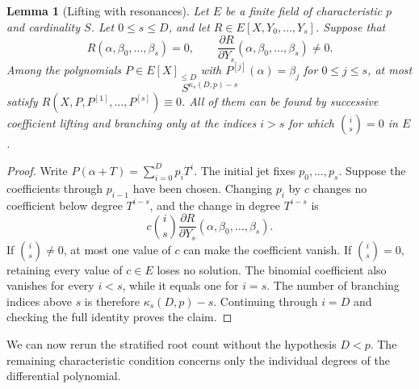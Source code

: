\documentclass[11pt,letterpaper]{article}
\newtheorem{lemma}[lemma]{Lemma}
\theoremstyle{definition}
\begin{document}
\begin{lemma}[Lifting with resonances]
\label{lem:resonant-lifting}
Let \(E\) be a finite field of characteristic \(p\) and cardinality \(S\).
Let \(0\leq s\leq D\), and let
\(R\in E[X,Y_0,\ldots,Y_s]\).  Suppose that
\[
  R(\alpha,\beta_0,\ldots,\beta_s)=0,
  \qquad
  \frac{\partial R}{\partial Y_s}
    (\alpha,\beta_0,\ldots,\beta_s)\neq0.
\]
Among the polynomials \(P\in E[X]_{\leq D}\) with
\(P^{[j]}(\alpha)=\beta_j\) for \(0\leq j\leq s\), at most
\begin{equation}
  S^{\kappa_s(D,p)-s}
  \label{eq:resonant-lift-count}
\end{equation}
satisfy
\(R(X,P,P^{[1]},\ldots,P^{[s]})\equiv0\).  All of them can be found by
successive coefficient lifting and branching only at the indices
\(i>s\) for which \(\binom is=0\) in \(E\).
\end{lemma}

\begin{proof}
Write \(P(\alpha+T)=\sum_{i=0}^Dp_iT^i\). The initial jet fixes
\(p_0,\ldots,p_s\). Suppose the coefficients through \(p_{i-1}\) have
been chosen. Changing \(p_i\) by \(c\) changes no coefficient below degree
\(T^{i-s}\), and the change in degree \(T^{i-s}\) is
\[
  c\binom is
  \frac{\partial R}{\partial Y_s}
    (\alpha,\beta_0,\ldots,\beta_s).
\]
If \(\binom is\neq0\), at most one value of \(c\) can make the coefficient
vanish.  If \(\binom is=0\), retaining every value of \(c\in E\) loses no
solution.  The binomial coefficient also vanishes for every \(i<s\), while
it equals one for \(i=s\).  The number of branching indices above \(s\) is
therefore \(\kappa_s(D,p)-s\).  Continuing through \(i=D\) and checking the
full identity proves the claim.
\end{proof}

We can now rerun the stratified root count without the hypothesis \(D<p\).
The remaining characteristic condition concerns only the individual
degrees of the differential polynomial.
\end{document}
